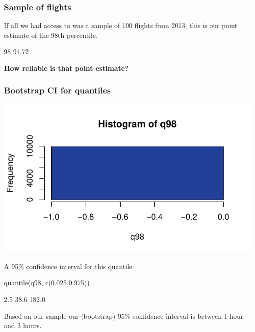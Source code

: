 \documentclass[a4paper]{article}
\begin{document}
\subsubsection{Sample of flights}
If all we had access to was a sample of 100 flights from 2013, this is our point estimate of the 98th percentile.
\begin{Schunk}
\begin{Soutput}
  98%
94.72 
\end{Soutput}
\end{Schunk}
\begin{greenbox}
	\textbf{How reliable is that point estimate?}
\end{greenbox}
\subsubsection{Bootstrap CI for quantiles}
\begin{Schunk}


{\centering \includegraphics[width=\maxwidth]{figure/listings-unnamed-chunk-179-1} 

}

\end{Schunk}
A 95\% confidence interval for this quantile:
\begin{Schunk}
\begin{Sinput}
quantile(q98, c(0.025,0.975))
\end{Sinput}
\begin{Soutput}
 2.5%
 38.6 182.0 
\end{Soutput}
\end{Schunk}
Based on our sample our (bootstrap) 95\% confidence interval is between 1 hour and 3 hours.
\end{document}
